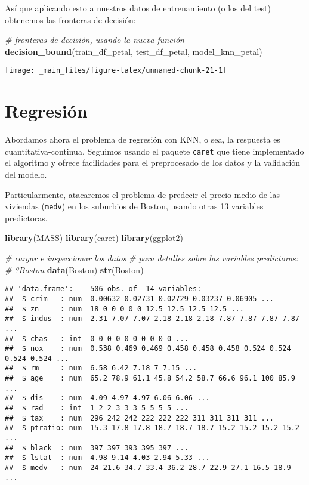 \documentclass[]{book}
\newenvironment{Shaded}{\begin{snugshade}}{\end{snugshade}}
\newcommand{\CommentTok}[1]{\textcolor[rgb]{0.56,0.35,0.01}{\textit{#1}}}
\newcommand{\KeywordTok}[1]{\textcolor[rgb]{0.13,0.29,0.53}{\textbf{#1}}}
\newcommand{\NormalTok}[1]{#1}
\begin{document}
Así que aplicando esto a nuestros datos de entrenamiento (o los del test) obtenemos las fronteras de decisión:

\begin{Shaded}
\begin{Highlighting}[]
\CommentTok{# fronteras de decisión, usando la nueva función}
\KeywordTok{decision_bound}\NormalTok{(train_df_petal, test_df_petal, model_knn_petal)}
\end{Highlighting}
\end{Shaded}

\begin{center}\texttt{[image: \_main\_files/figure-latex/unnamed-chunk-21-1]} \end{center}

\hypertarget{regresiuxf3n}{%
\section{Regresión}\label{regresiuxf3n}}

Abordamos ahora el problema de regresión con KNN, o sea, la respuesta es cuantitativa-continua. Seguimos usando el paquete \texttt{caret} que tiene implementado el algoritmo y ofrece facilidades para el preprocesado de los datos y la validación del modelo.

Particularmente, atacaremos el problema de predecir el precio medio de las viviendas (\texttt{medv}) en los suburbios de Boston, usando otras 13 variables predictoras.

\begin{Shaded}
\begin{Highlighting}[]
\KeywordTok{library}\NormalTok{(MASS)}
\KeywordTok{library}\NormalTok{(caret)}
\KeywordTok{library}\NormalTok{(ggplot2)}

\CommentTok{# cargar e inspeccionar los datos}
\CommentTok{# para detalles sobre las variables predictoras:}
\CommentTok{# ?Boston}
\KeywordTok{data}\NormalTok{(Boston)}
\KeywordTok{str}\NormalTok{(Boston)}
\end{Highlighting}
\end{Shaded}

\begin{verbatim}
## 'data.frame':    506 obs. of  14 variables:
##  $ crim   : num  0.00632 0.02731 0.02729 0.03237 0.06905 ...
##  $ zn     : num  18 0 0 0 0 0 12.5 12.5 12.5 12.5 ...
##  $ indus  : num  2.31 7.07 7.07 2.18 2.18 2.18 7.87 7.87 7.87 7.87 ...
##  $ chas   : int  0 0 0 0 0 0 0 0 0 0 ...
##  $ nox    : num  0.538 0.469 0.469 0.458 0.458 0.458 0.524 0.524 0.524 0.524 ...
##  $ rm     : num  6.58 6.42 7.18 7 7.15 ...
##  $ age    : num  65.2 78.9 61.1 45.8 54.2 58.7 66.6 96.1 100 85.9 ...
##  $ dis    : num  4.09 4.97 4.97 6.06 6.06 ...
##  $ rad    : int  1 2 2 3 3 3 5 5 5 5 ...
##  $ tax    : num  296 242 242 222 222 222 311 311 311 311 ...
##  $ ptratio: num  15.3 17.8 17.8 18.7 18.7 18.7 15.2 15.2 15.2 15.2 ...
##  $ black  : num  397 397 393 395 397 ...
##  $ lstat  : num  4.98 9.14 4.03 2.94 5.33 ...
##  $ medv   : num  24 21.6 34.7 33.4 36.2 28.7 22.9 27.1 16.5 18.9 ...
\end{verbatim}
\end{document}
